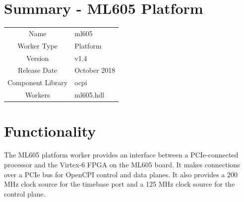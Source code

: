 \documentclass{article}
\author{} %
\date{Version \docVersion} %
\title{\docTitle}
\def\docVersion{1.4}
\def\comp{ml605}
\def\Comp{ML605 Platform}
\begin{document}
\section*{Summary - \Comp}
\begin{tabular}{|c|M{13.5cm}|}
	\hline
	                  &                                                    \\
	\hline
	Name              & \comp                                              \\
	\hline
	Worker Type       & Platform                                           \\
	\hline
	Version           & v\docVersion \\
	\hline
	Release Date      & October 2018 \\
	\hline
	Component Library & ocpi                                        \\
	\hline
	Workers & \comp.hdl                                        \\
	\hline
\end{tabular}

\section*{Functionality}
\begin{flushleft}
	The ML605 platform worker provides an interface between a PCIe-connected processor and the Virtex-6 FPGA on the ML605 board. It makes connections over a PCIe bus for OpenCPI control and data planes. It also provides a 200 MHz clock source for the timebase port and a 125 MHz clock source for the control plane.
\end{flushleft}
\end{document}
